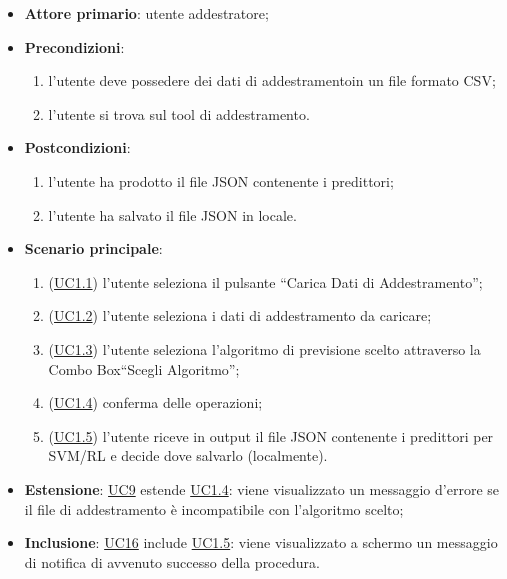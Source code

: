 		\begin{itemize}
			\item\textbf{Attore primario}: utente addestratore;
			\item\textbf{Precondizioni}: 
				\begin{enumerate}
					\item l’utente deve possedere dei dati di addestramento\glo in un file formato CSV\glo;
					\item l’utente si trova sul tool di addestramento.
				\end{enumerate}
			\item\textbf{Postcondizioni}:
				\begin{enumerate}
					\item l’utente ha prodotto il file JSON contenente i predittori;
					\item l’utente ha salvato il file JSON in locale.
				\end{enumerate}
			\item\textbf{Scenario principale}:
				\begin{enumerate}
					\item (\hyperref[par:UC1.1]{UC1.1}) l’utente seleziona il pulsante “Carica Dati di Addestramento”;
					\item (\hyperref[par:UC1.2]{UC1.2}) l’utente seleziona i dati di addestramento da caricare;
					\item (\hyperref[par:UC1.3]{UC1.3}) l’utente seleziona l’algoritmo di previsione scelto attraverso la Combo Box\glo “Scegli Algoritmo”; 
					\item (\hyperref[par:UC1.4]{UC1.4}) conferma delle operazioni; 
					\item (\hyperref[par:UC1.5]{UC1.5}) l’utente riceve in output il file JSON contenente i predittori per SVM/RL e decide dove salvarlo (localmente).  
				\end{enumerate}
			\item\textbf{Estensione}: \hyperref[par:UC9]{UC9} estende \hyperref[par:UC1.4]{UC1.4}: viene visualizzato un messaggio d’errore se il file di addestramento è incompatibile con l’algoritmo scelto;
			\item\textbf{Inclusione}: \hyperref[par:UC16]{UC16} include \hyperref[par:UC1.5]{UC1.5}: viene visualizzato a schermo un messaggio di notifica di avvenuto successo della procedura.
		\end{itemize}
		
		\label{par:UC1.1}
